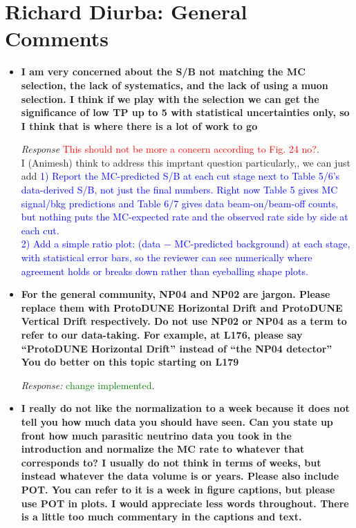 \documentclass[11pt]{article}
\begin{document}
\section*{Richard Diurba: General Comments}

\begin{itemize}[leftmargin=*]

\item \textbf{I am very concerned about
the S/B not matching the MC selection, the lack of systematics, and the lack of using a muon
selection. I think if we play with the selection we can get the significance of low TP up to 5 with
statistical uncertainties only, so I think that is where there is a lot of work to go}

\textit{Response} \textcolor{red}{This should not be more a concern according to Fig. 24 no?}.\\
I (Animesh) think to address this imprtant question particularly,, we can just add \textcolor{blue}{1) Report the MC-predicted S/B at each cut stage next to Table 5/6's data-derived S/B, not just the final numbers. Right now Table 5 gives MC signal/bkg predictions and Table 6/7 gives data beam-on/beam-off counts, but nothing puts the MC-expected rate and the observed rate side by side at each cut.\\
2) Add a simple ratio plot: (data − MC-predicted background) at each stage, with statistical error bars, so the reviewer can see numerically where agreement holds or breaks down rather than eyeballing shape plots.}

\item \textbf{For the general community, NP04 and NP02 are jargon. Please replace them with ProtoDUNE
Horizontal Drift and ProtoDUNE Vertical Drift respectively. Do not use NP02 or NP04 as a term
to refer to our data-taking. For example, at L176, please say “ProtoDUNE Horizontal Drift”
instead of “the NP04 detector” You do better on this topic starting on L179}

\textit{Response:} \textcolor{green}{change implemented}.

\item \textbf{I really do not like the normalization to a week because it does not tell you how much data you
should have seen. Can you state up front how much parasitic neutrino data you took in the
introduction and normalize the MC rate to whatever that corresponds to? I usually do not think in
terms of weeks, but instead whatever the data volume is or years. Please also include POT. You
can refer to it is a week in figure captions, but please use POT in plots.
I would appreciate less words throughout. There is a little too much commentary in the captions
and text.}


\end{itemize}
\end{document}
